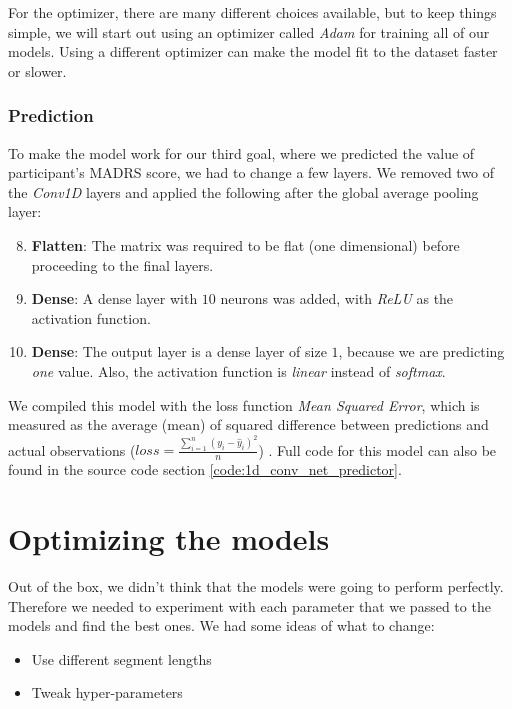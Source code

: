 For the optimizer, there are many different choices available, but to keep things simple, we will start out using an optimizer called \textit{Adam} for training all of our models. Using a different optimizer can make the model fit to the dataset faster or slower. 

\subsubsection{Prediction}
To make the model work for our third goal, where we predicted the value of participant's MADRS score, we had to change a few layers. We removed two of the \textit{Conv1D} layers and applied the following after the global average pooling layer:

\begin{enumerate}
      \setcounter{enumi}{7}
      \item \textbf{Flatten}: The matrix was required to be flat (one dimensional) before proceeding to the final layers.
      \item \textbf{Dense}: A dense layer with $10$ neurons was added, with \textit{ReLU} as the activation function. 
      \item \textbf{Dense}: The output layer is a dense layer of size $1$, because we are predicting \textit{one} value. 
            Also, the activation function is \textit{linear} instead of \textit{softmax}.
\end{enumerate}

We compiled this model with the loss function \textit{Mean Squared Error}, which is measured as the average (mean) of squared difference between predictions and actual observations ($ loss = \frac{\sum_{i=1}^{n}(y_i-\hat{y}_i)^2}{n} $) \cite{loss_functions}. Full code for this model can also be found in the source code section \ref{code:1d_conv_net_predictor}.

\vfill

\section{Optimizing the models}

\noindent Out of the box, we didn't think that the models were going to perform perfectly. Therefore we needed to experiment with each parameter that we passed to the models and find the best ones. We had some ideas of what to change:

\begin{itemize}
    \item Use different segment lengths
    \item Tweak hyper-parameters
\end{itemize}

